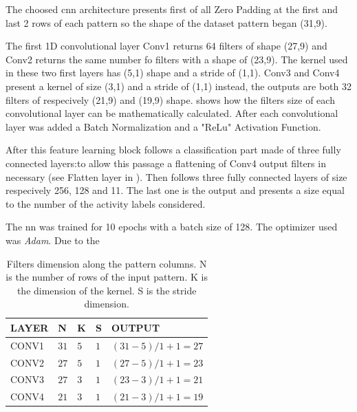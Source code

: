 The choosed \gls{cnn} architecture presents first of all Zero Padding at the first and last 2 rows of each pattern so the shape of the dataset pattern began (31,9). 

The first 1D convolutional layer Conv1 returns 64 filters of shape (27,9) and Conv2 returns the same number fo filters with a shape of (23,9). The kernel used in these two first layers has (5,1) shape and a stride of (1,1). 
Conv3 and Conv4 present a kernel of size (3,1) and a stride of (1,1) instead, the outputs are both 32 filters of respecively (21,9) and (19,9) shape.
 shows how the filters size of each convolutional layer can be mathematically calculated. After each convolutional layer was added a Batch Normalization and a "ReLu" Activation Function.

After this feature learning block follows a classification part made of three fully connected layers:to allow this passage a flattening of Conv4 output filters in necessary (see Flatten layer in ). Then follows three fully connected layers of size respecively 256, 128 and 11. The last one is the output and presents a size equal to the number of the activity labels considered.








The \gls{nn} was trained for 10 epochs with a batch size of 128. The optimizer used was \textit{Adam}. Due to the 



\begin{table}[htp]
\small
	\centering
		\renewcommand{\arraystretch}{1}%
	\begin{tabular}{@{}lllll@{}}
	\toprule
	LAYER & N & K & S & OUTPUT\\
	\midrule
	CONV1 & $31$ & $5$ & $1$ & $(31-5)/1+1 = 27$\\
	CONV2 & $27$ & $5$ & $1$ & $(27-5)/1+1 = 23$\\
	CONV3 & $27$ & $3$ & $1$ & $(23-3)/1+1 = 21$\\
	CONV4 & $21$ & $3$ & $1$ & $(21-3)/1+1 = 19$\\ 
	\bottomrule
	\end{tabular}
	\caption{Filters dimension along the pattern columns. N is the number of rows of the input pattern. K is the dimension of the kernel. S is the stride dimension.}
	\label{tab:filtersize}
\end{table}



